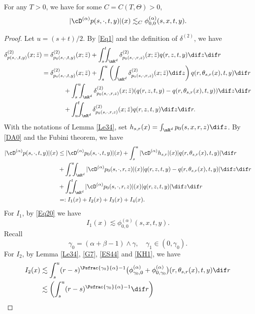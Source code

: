 \begin{lemma}\label{Le35}
For any $T>0$, we have for some $C=C(T,\Theta)>0$,
\[
|\cD^{(\alpha)}p(s,\cdot,t,y)|(x)\lesssim_C \phi^{(\alpha)}_{0,0}(s,x,t,y).
\]
\end{lemma}
\begin{proof}
Let $u=(s+t)/2$. By \eqref{Eq1} and the definition of $\delta^{(2)}$, we have
\begin{align*}
\delta^{(2)}_{p(s,\cdot,t,y)}(x;\bar z)&=
\delta^{(2)}_{p_0(s,\cdot,t,y)}(x;\bar z)+\int^t_{s}\!\!\!\int_{\mR^d}\delta^{(2)}_{p_0(s,\cdot,r,z)}(x;\bar z)q(r,z,t,y)\dif z\dif r\\
&=\delta^{(2)}_{p_0(s,\cdot,t,y)}(x;\bar z)+\int^u_{s}\left(\int_{\mR^d}\delta^{(2)}_{p_0(s,\cdot,r,z)}(x;\bar z)\dif z\right)q(r,\theta_{s,r}(x),t,y)\dif r\\
&\hspace*{1.2cm}+\int^u_{s}\!\!\!\int_{\mR^d}\delta^{(2)}_{p_0(s,\cdot,r,z)}(x;\bar z)(q(r,z,t,y)-q(r,\theta_{s,r}(x),t,y))\dif z\dif r\\
&\hspace*{1.2cm}+\int^t_u\!\!\!\int_{\mR^d}\delta^{(2)}_{p_0(s,\cdot,r,z)}(x;\bar z)q(r,z,t,y)\dif z\dif r.
\end{align*}
With the notations of Lemma \ref{Le34}, set
$h_{s,r}(x)=\int_{\mR^d}p_0(s,x,r,z)\dif z$. By \eqref{DA0} and the Fubini theorem, we have
\begin{align*}
|\cD^{(\alpha)} p(s,\cdot,t,y)|(x)
&\leq|\cD^{(\alpha)} p_0(s,\cdot,t,y)|(x)+\int^u_s |\cD^{(\alpha)}h_{s,r}|(x)|q(r,\theta_{s,r}(x),t,y)|\dif r
\\&+\int^u_s\!\!\!\int_{\mR^d}|\cD^{(\alpha) }p_0(s,\cdot,r,z)|(x)|q(r,z,t,y)-q(r,\theta_{s,r}(x),t,y)|\dif z\dif r
\\&+\int^t_u\!\!\!\int_{\mR^d}|\cD^{(\alpha) }p_0(s,\cdot,r,z)|(x)|q(r,z,t,y)|\dif z\dif r\\
&=:I_1(x)+I_2(x)+I_3(x)+I_4(x).
\end{align*}
For $I_1$, by \eqref{Eq20} we have
\[
I_1(x)\lesssim \phi^{(\alpha)}_{0,0}(s,x,t,y).
\]
Recall
\[
\gamma_0{=}(\alpha+\beta-1)\wedge\gamma,\quad \gamma_1\in(0,\gamma_0).
\]
For $I_2$, by Lemma \ref{Le34}, \eqref{G7}, \eqref{ES44} and \eqref{KH1}, we have
\begin{align*}
I_2(x)&\lesssim\int^u_s(r-s)^{\Psfrac{\gamma_0}{\alpha}-1}\bigl(\phi^{(\alpha)}_{\gamma_0,0}
+\phi^{(\alpha)}_{0,\gamma_0}\bigr)(r,\theta_{s,r}(x),t,y)\dif r
\\&\lesssim\biggl(\int^u_s(r-s)^{\Psfrac{\gamma_0}{\alpha}-1}\dif r\biggr)

\end{align*}
\end{proof}
